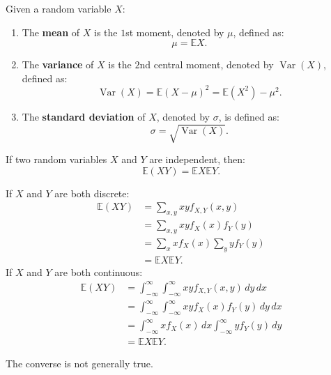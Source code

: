 \documentclass{huhtakm-template-book-v2}
\newcommand{\expect}{\mathbb{E}}
\DeclareMathOperator{\Var}{Var}
\begin{document}
    \begin{defn}
        Given a random variable $X$:
        \begin{enumerate}
            \item The \textbf{mean} of $X$ is the $1$st moment, denoted by $\mu$, defined as:
            \begin{equation*}
                \mu = \expect{X}.
            \end{equation*}
            \item The \textbf{variance} of $X$ is the $2$nd central moment, denoted by $\Var(X)$, defined as:
            \begin{equation*}
                \Var(X) = \expect(X-\mu)^{2} = \expect(X^{2})-\mu^{2}.
            \end{equation*}
            \item The \textbf{standard deviation} of $X$, denoted by $\sigma$, is defined as:
            \begin{equation*}
                \sigma = \sqrt{\Var(X)}.
            \end{equation*}
        \end{enumerate}
    \end{defn}
    \begin{lem}
        If two random variables $X$ and $Y$ are independent, then:
        \begin{equation*}
            \expect(XY) = \expect{X}\expect{Y}.
        \end{equation*}
    \end{lem}
    \begin{proofing}
        If $X$ and $Y$ are both discrete:
        \begin{align*}
            \expect(XY) &= \sum_{x,y}xyf_{X,Y}(x, y)\\
            &= \sum_{x,y}xyf_{X}(x)f_{Y}(y)\\
            &= \sum_{x}xf_{X}(x)\sum_{y}yf_{Y}(y)\\
            &= \expect{X}\expect{Y}.
        \end{align*}
        If $X$ and $Y$ are both continuous:
        \begin{align*}
            \expect(XY) &= \int_{-\infty}^{\infty}\int_{-\infty}^{\infty} xyf_{X,Y}(x, y)\,dy\,dx\\
            &= \int_{-\infty}^{\infty}\int_{-\infty}^{\infty} xyf_{X}(x)f_{Y}(y)\,dy\,dx\\
            &= \int_{-\infty}^{\infty} xf_{X}(x)\,dx\int_{-\infty}^{\infty} yf_{Y}(y)\,dy\\
            &= \expect{X}\expect{Y}.
        \end{align*}
    \end{proofing}
    \begin{rem}
        The converse is not generally true.
    \end{rem}
    \newpage
\end{document}
